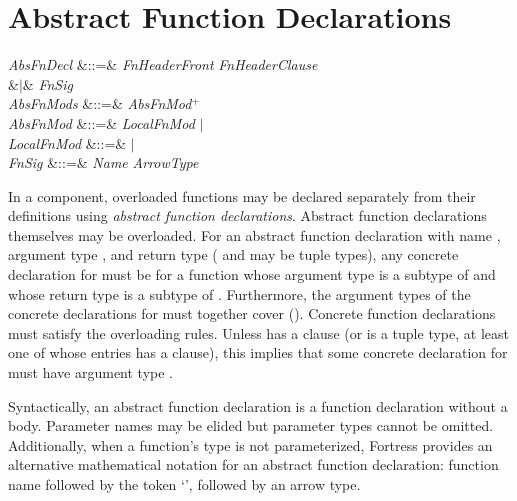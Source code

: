 \section{Abstract Function Declarations}

\begin{Grammar}
\emph{AbsFnDecl} &::=&  \emph{FnHeaderFront}
\emph{FnHeaderClause}\\
&$|$& \emph{FnSig} \\

\emph{AbsFnMods} &::=& \emph{AbsFnMod}$^+$\\

\emph{AbsFnMod} &::=& \emph{LocalFnMod} $|$ \\

\emph{LocalFnMod} &::=&  $|$ \\

\emph{FnSig} &::=& \emph{Name} \EXP{\mathrel{\mathtt{:}}} \emph{ArrowType}\\
\end{Grammar}

In a component, overloaded functions may be declared separately from their
definitions using \emph{abstract function declarations}.
Abstract function declarations themselves may be overloaded.
For an abstract function declaration with name , argument type
, and return type  ( and  may be tuple types),
any concrete declaration for  must be for a function whose argument
type is a subtype of  and whose return type is a subtype of .
Furthermore, the argument types of the concrete declarations for
 must together cover  ().
Concrete function declarations must satisfy the overloading rules.
Unless  has a  clause (or is a tuple type, at least
one of whose entries has a  clause), this implies that some
concrete declaration for  must have argument type .

Syntactically, an abstract function declaration is a function declaration
without a body.  Parameter names may be elided but parameter types cannot
be omitted.  Additionally, when a function's type is not parameterized,
Fortress provides an alternative mathematical notation for
an abstract function declaration: function name followed by the token
`\EXP{\COLONOP}', followed by an arrow type.

